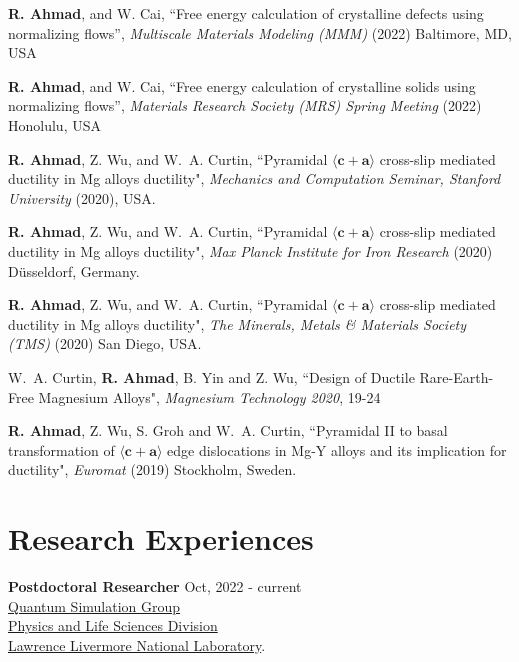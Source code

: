 \documentclass[margin,line]{resume}
\begin{document}
\begin{resume}
    \textbf{R. Ahmad}, and W. Cai, ``Free energy calculation of crystalline defects using normalizing flows'', \textit{Multiscale Materials Modeling (MMM)} (2022) Baltimore, MD, USA

    \textbf{R. Ahmad}, and W. Cai, ``Free energy calculation of crystalline solids using normalizing flows'', \textit{Materials Research Society (MRS) Spring Meeting} (2022) Honolulu, USA

    \textbf{R. Ahmad}, Z. Wu, and W.~A. Curtin, ``Pyramidal $\langle \boldsymbol{c} + \boldsymbol{a} \rangle$ cross-slip mediated ductility in Mg alloys ductility", \textit{Mechanics and Computation Seminar, Stanford University} (2020), USA.

    \textbf{R. Ahmad}, Z. Wu, and W.~A. Curtin, ``Pyramidal $\langle \boldsymbol{c} + \boldsymbol{a} \rangle$ cross-slip mediated ductility in Mg alloys ductility", \textit{Max Planck Institute for Iron Research} (2020) D\"usseldorf, Germany.

    \textbf{R. Ahmad}, Z. Wu, and W.~A. Curtin, ``Pyramidal $\langle \boldsymbol{c} + \boldsymbol{a} \rangle$ cross-slip mediated ductility in Mg alloys ductility", \textit{The Minerals, Metals \& Materials Society (TMS)} (2020) San Diego, USA.

    W.~A. Curtin, \textbf{R. Ahmad}, B. Yin and Z. Wu, ``Design of Ductile Rare-Earth-Free Magnesium Alloys", \textit{Magnesium Technology 2020}, 19-24

    \textbf{R. Ahmad}, Z. Wu, S. Groh and W.~A. Curtin, ``Pyramidal II to basal transformation of $\langle
        \boldsymbol{c} + \boldsymbol{a} \rangle$ edge dislocations in Mg-Y alloys and its implication for
    ductility", \textit{Euromat} (2019) Stockholm, Sweden.


    \section{\mysidestyle Research Experiences}
    \textbf{\textsf{Postdoctoral Researcher}}    \hfill  \small{Oct, 2022 - current} \\
    \href{https://qsg.llnl.gov}{Quantum Simulation Group}\\
    \href{https://pls.llnl.gov}{Physics and Life Sciences Division}\\
    \href{https://llnl.gov}{Lawrence Livermore National Laboratory}.


\end{resume}
\end{document}
